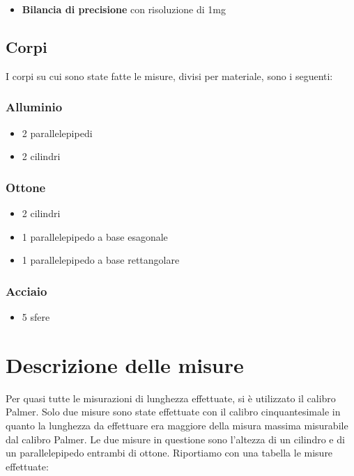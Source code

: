 \documentclass{article}
\begin{document}
\begin{itemize}
\item \textbf{Bilancia di precisione} con risoluzione di 1mg
\end{itemize}



\subsection{Corpi}
I corpi su cui sono state fatte le misure, divisi per materiale, sono i seguenti: 
\subsubsection{\textbf{Alluminio}}

\begin{itemize}
\item 2 parallelepipedi 
\item 2 cilindri 
\end{itemize}

\subsubsection{Ottone}

\begin{itemize}
\item  2 cilindri
\item 1 parallelepipedo a base esagonale
\item 1 parallelepipedo a base rettangolare
\end{itemize}

\subsubsection{Acciaio}

\begin{itemize}
\item 5 sfere
\end{itemize}


\section{Descrizione delle misure}
Per quasi tutte le misurazioni di lunghezza effettuate, si è utilizzato il calibro Palmer. Solo due misure sono state effettuate con il calibro cinquantesimale in quanto la lunghezza da effettuare era maggiore della misura massima misurabile dal calibro Palmer. Le due misure in questione sono l'altezza di un cilindro e di un parallelepipedo entrambi di ottone.
Riportiamo con una tabella le misure effettuate:
\end{document}

